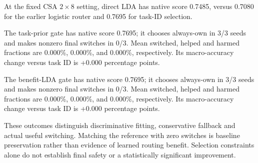 At the fixed CSA $2\times8$ setting, direct LDA has native score 0.7485, versus 0.7080 for the earlier logistic router and 0.7695 for task-ID selection.

The task-prior gate has native score 0.7695; it chooses always-own in 3/3 seeds and makes nonzero final switches in 0/3. Mean switched, helped and harmed fractions are 0.000\%, 0.000\%, and 0.000\%, respectively. Its macro-accuracy change versus task ID is +0.000 percentage points.

The benefit-LDA gate has native score 0.7695; it chooses always-own in 3/3 seeds and makes nonzero final switches in 0/3. Mean switched, helped and harmed fractions are 0.000\%, 0.000\%, and 0.000\%, respectively. Its macro-accuracy change versus task ID is +0.000 percentage points.

These outcomes distinguish discriminative fitting, conservative fallback and actual useful switching. Matching the reference with zero switches is baseline preservation rather than evidence of learned routing benefit. Selection constraints alone do not establish final safety or a statistically significant improvement.
